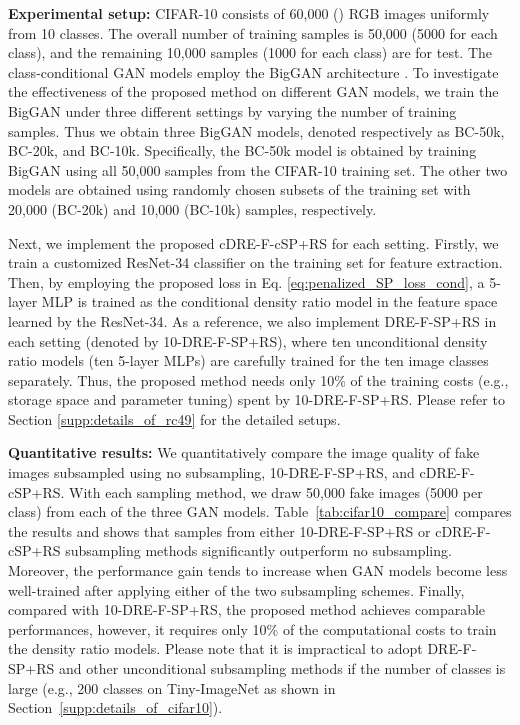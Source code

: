 \documentclass[10pt, twocolumn]{article}
\theoremstyle{definition}
\begin{document}
{\setlength{\parindent}{0cm}\textbf{Experimental setup:}} CIFAR-10 consists of 60,000 () RGB images uniformly from 10 classes. The overall number of training samples is 50,000 (5000 for each class), and the remaining 10,000 samples (1000 for each class) are for test. The class-conditional GAN models employ the BigGAN architecture \cite{brock2018large}. To investigate the effectiveness of the proposed method on different GAN models, we train the BigGAN under three different settings by varying the number of training samples. Thus we obtain three BigGAN models, denoted respectively as BC-50k, BC-20k, and BC-10k. Specifically, the BC-50k model is obtained by training BigGAN using all 50,000 samples from the CIFAR-10 training set. The other two models are obtained using randomly chosen subsets of the training set with 20,000 (BC-20k) and 10,000 (BC-10k) samples, respectively.

Next, we implement the proposed cDRE-F-cSP+RS for each setting. Firstly, we train a customized ResNet-34 classifier on the training set for feature extraction. Then, by employing the proposed loss in Eq. \eqref{eq:penalized_SP_loss_cond}, a 5-layer MLP is trained as the conditional density ratio model in the feature space learned by the ResNet-34. As a reference, we also implement DRE-F-SP+RS \cite{ding2020subsampling} in each setting (denoted by 10-DRE-F-SP+RS), where ten unconditional density ratio models (ten 5-layer MLPs) are carefully trained for the ten image classes separately. Thus, the proposed method needs only 10\% of the training costs (e.g., storage space and parameter tuning) spent by 10-DRE-F-SP+RS. Please refer to Section \ref{supp:details_of_rc49} for the detailed setups.


{\setlength{\parindent}{0cm}\textbf{Quantitative results:}} We quantitatively compare the image quality of fake images subsampled using no subsampling, 10-DRE-F-SP+RS, and cDRE-F-cSP+RS. With each sampling method, we draw 50,000 fake images (5000 per class) from each of the three GAN models. Table~\ref{tab:cifar10_compare} compares the results and shows that samples from either 10-DRE-F-SP+RS or cDRE-F-cSP+RS subsampling methods significantly outperform no subsampling. Moreover, the performance gain tends to increase when GAN models become less well-trained after applying either of the two subsampling schemes. Finally, compared with 10-DRE-F-SP+RS, the proposed method achieves comparable performances, however, it requires only 10\% of the computational costs to train the density ratio models. Please note that it is impractical to adopt DRE-F-SP+RS \cite{ding2020subsampling} and other unconditional subsampling methods \cite{azadi2018discriminator, turner2018metropolis, liu2020collaborative, che2020your} if the number of classes is large (e.g., 200 classes on Tiny-ImageNet as shown in Section~\ref{supp:details_of_cifar10}). 
\end{document}
